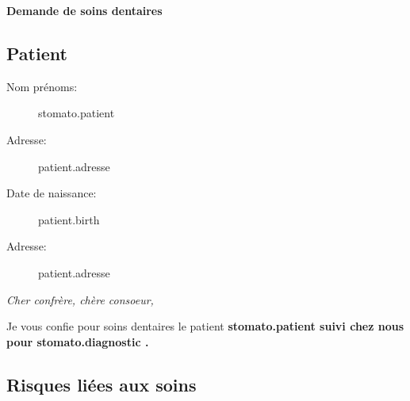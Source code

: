 \documentclass[headlines=6,headinclude=true,11pt]{scrartcl}
\begin{document}
\begin{center}
  \textcolor{Gris}{\bfseries{\huge{\textsf{Demande de soins dentaires}}} }
\end{center}

\subsection*{Patient}
   \begin{description}
   \item[Nom prénoms:] {{ stomato.patient }}
   \item[Adresse:] {{ patient.adresse }}
   \item[Date de naissance:] {{ patient.birth }}
   \item[Adresse:] {{ patient.adresse }}
   \end{description}




   \itshape{Cher confrère, chère consoeur,}

   Je vous confie pour soins dentaires le patient
\bfseries{ {{stomato.patient }} } suivi chez nous pour
{{ stomato.diagnostic }}.
    
 \subsection*{Risques liées aux soins }
 
\end{document}

